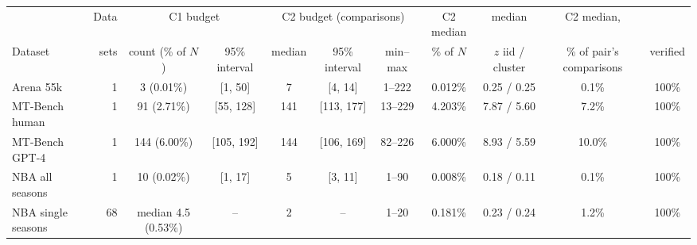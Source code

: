 \begin{tabular}{lrccccccccc}
\toprule
 & Data & \multicolumn{2}{c}{C1 budget} & \multicolumn{3}{c}{C2 budget (comparisons)} & C2 median & median & C2 median, & \\
\cmidrule(lr){3-4}\cmidrule(lr){5-7}
Dataset & sets & count (\% of $N$) & 95\% interval & median & 95\% interval & min--max & \% of $N$ & $z$ iid / cluster & \% of pair's comparisons & verified \\
\midrule
Arena 55k & 1 & 3 (0.01\%) & [1, 50] & 7 & [4, 14] & 1--222 & 0.012\% & 0.25 / 0.25 & 0.1\% & 100\% \\
MT-Bench human & 1 & 91 (2.71\%) & [55, 128] & 141 & [113, 177] & 13--229 & 4.203\% & 7.87 / 5.60 & 7.2\% & 100\% \\
MT-Bench GPT-4 & 1 & 144 (6.00\%) & [105, 192] & 144 & [106, 169] & 82--226 & 6.000\% & 8.93 / 5.59 & 10.0\% & 100\% \\
NBA all seasons & 1 & 10 (0.02\%) & [1, 17] & 5 & [3, 11] & 1--90 & 0.008\% & 0.18 / 0.11 & 0.1\% & 100\% \\
NBA single seasons & 68 & median 4.5 (0.53\%) & -- & 2 & -- & 1--20 & 0.181\% & 0.23 / 0.24 & 1.2\% & 100\% \\
\bottomrule
\end{tabular}
